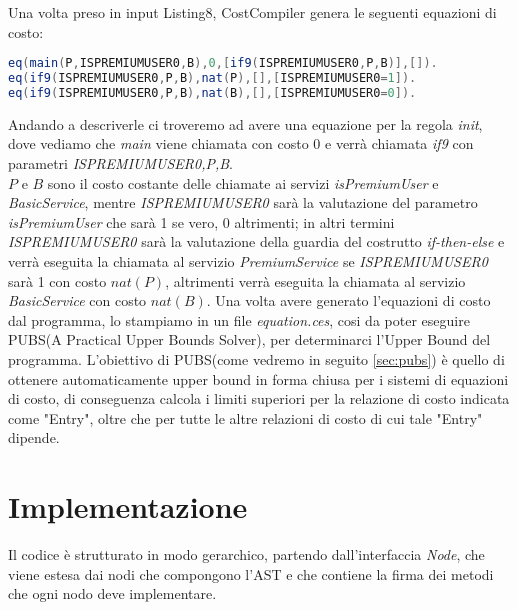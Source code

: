 \documentclass[../../main.tex]{subfiles}
\begin{document}
Una volta preso in input Listing8, CostCompiler genera le seguenti equazioni di costo:
\begin{lstlisting}[language=Java, caption={Equazioni di costo per Listing8}]
eq(main(P,ISPREMIUMUSER0,B),0,[if9(ISPREMIUMUSER0,P,B)],[]).
eq(if9(ISPREMIUMUSER0,P,B),nat(P),[],[ISPREMIUMUSER0=1]).
eq(if9(ISPREMIUMUSER0,P,B),nat(B),[],[ISPREMIUMUSER0=0]).
\end{lstlisting}
Andando a descriverle ci troveremo ad avere una equazione per la regola \textit{init}, dove vediamo che \textit{main} viene chiamata con costo 0 e verrà chiamata \textit{if9} con parametri \textit{ISPREMIUMUSER0,P,B}.\\
$P$ e $B$ sono il costo costante delle chiamate ai servizi \textit{isPremiumUser} e \textit{BasicService}, mentre \textit{ISPREMIUMUSER0} sarà la valutazione del parametro \textit{isPremiumUser} che sarà 1 se vero, 0 altrimenti; in altri termini \textit{ISPREMIUMUSER0} sarà la valutazione della guardia del costrutto \textit{if-then-else} e verrà eseguita la chiamata al servizio \textit{PremiumService} se \textit{ISPREMIUMUSER0} sarà 1 con costo $nat(P)$, altrimenti verrà eseguita la chiamata al servizio \textit{BasicService} con costo $nat(B)$. 
Una volta avere generato l'equazioni di costo dal programma, lo stampiamo in un file \textit{equation.ces}, cosi da poter eseguire PUBS(A Practical Upper Bounds Solver), per determinarci l'Upper Bound del programma.
L'obiettivo di PUBS(come vedremo in seguito \ref{sec:pubs}) è quello di ottenere automaticamente upper bound in forma chiusa per i sistemi di equazioni di costo, di conseguenza calcola i limiti superiori per la relazione di costo indicata come "Entry", oltre che per tutte le altre relazioni di costo di cui tale "Entry" dipende.
\section{Implementazione}

Il codice è strutturato in modo gerarchico, partendo dall'interfaccia \textit{Node}, che viene estesa dai nodi che compongono l'AST e che contiene la firma dei metodi che ogni nodo deve implementare.\\
\end{document}
